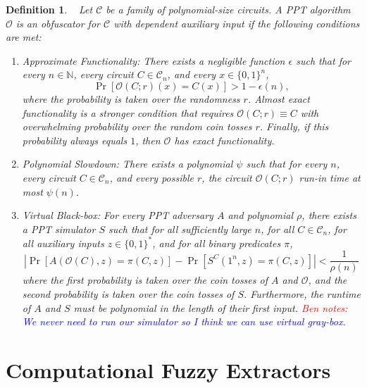 \documentclass[11pt]{article}
\newcommand{\zo}{\ensuremath{\{0, 1\}}}
\newtheorem{definition}[theorem]{Definition}
\newcommand{\authnote}[2]{{\textcolor{red}{\textsf{#1 notes: }\textcolor{blue}{ #2}}\marginpar{\textcolor{red}{\textbf{!!!!!}}}}}
\newcommand{\authnote}[2]{}
\newcommand{\bnote}[1]{{\authnote{Ben}{#1}}}
\begin{document}
\begin{definition}~\cite{barak2001possibility, goldwasser2005impossibility}  
\label{def:obf} Let $\mathcal{C}$ be a family of polynomial-size circuits.  A PPT algorithm $\mathcal{O}$ is an obfuscator for $\mathcal{C}$ with dependent auxiliary input if the following conditions are met:
\begin{enumerate}
\item \emph{Approximate Functionality:}  There exists a negligible function $\epsilon$ such that for every $n\in \mathbb{N}$, every circuit $C\in \mathcal{C}_n$, and every $x\in\zo^n$, 
\[
\Pr[\mathcal{O}(C; r)(x) = C(x)] > 1-\epsilon(n),
\]
where the probability is taken over the randomness $r$.  \emph{Almost exact functionality} is a stronger condition that requires $\mathcal{O}(C;r)\equiv C$ with overwhelming probability over the random coin tosses $r$.  Finally, if this probability always equals $1$, then $\mathcal{O}$ has \emph{exact functionality}.
\item \emph{Polynomial Slowdown:}  There exists a polynomial $\psi$ such that for every $n$, every circuit $C\in \mathcal{C}_n$, and every possible $r$, the circuit $\mathcal{O}(C; r)$ run-in time at most $\psi(n)$.
\item \emph{Virtual Black-box:}  For every PPT adversary $A$ and polynomial $\rho$, there exists a PPT simulator $S$ such that for all sufficiently large $n$, for all $C\in \mathcal{C}_n$, for all auxiliary inputs $z\in \zo^*$, 
and for all binary predicates $\pi$, 
\[
|\Pr[A(\mathcal{O}(C), z) = \pi(C, z)] - \Pr[S^C(1^n, z) = \pi(C, z)] | < \frac{1}{\rho(n)}
\]
where the first probability is taken over the coin tosses of $A$ and $\mathcal{O}$, and the second probability is taken over the coin tosses of $S$.  Furthermore, the runtime of $A$ and $S$ must be polynomial in the length of their first input.
\bnote{We never need to run our simulator so I think we can use virtual gray-box.}
\end{enumerate}
\end{definition}


\section{Computational Fuzzy Extractors}
\label{sec:fuzzy extractors}
\end{document}
